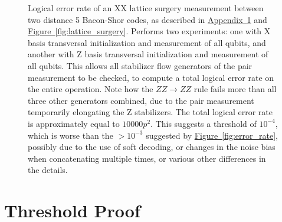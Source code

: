 \documentclass[onecolumn,unpublished,a4paper]{quantumarticle}
\theoremstyle{definition}
\theoremstyle{definition}
\theoremstyle{definition}
\DeclareRobustCommand{\app}[1]{\hyperref[app:#1]{Appendix~\ref*{app:#1}}}
\newcommand{\fig}[1]{\hyperref[fig:#1]{Figure~\ref*{fig:#1}}}
\begin{document}
\begin{figure}[H]
    \centering
    \caption{
        Logical error rate of an XX lattice surgery measurement between two distance 5 Bacon-Shor codes, as described in \app{threshold} and \fig{lattice_surgery}.
        Performs two experiments: one with X basis transversal initialization and measurement of all qubits, and another with Z basis transversal initialization and measurement of all qubits.
        This allows all stabilizer flow generators of the pair measurement to be checked, to compute a total logical error rate on the entire operation.
        Note how the $ZZ \rightarrow ZZ$ rule fails more than all three other generators combined, due to the pair measurement temporarily elongating the Z stabilizers.
        The total logical error rate is approximately equal to $10000p^2$.
        This suggests a threshold of $10^{-4}$, which is worse than the $>10^{-3}$ suggested by \fig{error_rate}, possibly due to the use of soft decoding, or changes in the noise bias when concatenating multiple times, or various other differences in the details.
    }
    \label{fig:error_rate_xx}
\end{figure}

\section{Threshold Proof}
\label{app:threshold}
\end{document}
